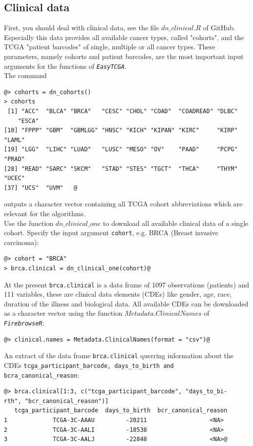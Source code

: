 \documentclass{TechReport}
\begin{document}
\subsection{Clinical data}
First, you should deal with clinical data, see the file $dn\_clinical.R$ of GitHub.
Especially this data provides all available cancer types, called "cohorts", 
and the TCGA  "patient barcodes"  of single, multiple or all cancer types. These
parameters, namely cohorts and patient barcodes, are the most
important input arguments for the functions of \texttt{\em EasyTCGA}. \\
The command
\begin{lstlisting}[style=base]
@> cohorts = dn_cohorts()
> cohorts
 [1] "ACC"  "BLCA" "BRCA"   "CESC" "CHOL" "COAD"  "COADREAD" "DLBC"  
    "ESCA"    
[10] "FPPP" "GBM"  "GBMLGG" "HNSC" "KICH" "KIPAN" "KIRC"     "KIRP"  "LAML"    
[19] "LGG"  "LIHC" "LUAD"   "LUSC" "MESO" "OV"    "PAAD"     "PCPG"  "PRAD"    
[28] "READ" "SARC" "SKCM"   "STAD" "STES" "TGCT"  "THCA"     "THYM"  "UCEC"    
[37] "UCS"  "UVM"   @
\end{lstlisting}
outputs a character vector containing all TCGA cohort abbreviations which are
relevant for the algorithms.\\
Use the function $dn\_clinical\_one$ to download all available clinical data of a
single cohort. Specify the input argument {\tt cohort}, e.g. BRCA 
(Breast invasive carcinoma):  
\begin{lstlisting}[style=base]
@> cohort = "BRCA"
> brca.clinical = dn_clinical_one(cohort)@
\end{lstlisting}
At the present {\tt brca.clinical} is a data frame of 1097 observations (patients)
and 111 variables, these are clinical data elements (CDEs) like 
gender, age, race, duration of the illness and biological data. All available CDEs
can be downloaded as a character vector using the 
function $Metadata.ClinicalNames$ of \texttt{\em FirebrowseR}:
\begin{lstlisting}[style=base]
@> clinical.names = Metadata.ClinicalNames(format = "csv")@
\end{lstlisting}
An extract of the data frame {\tt brca.clinical} querring information about the CDEs
{\tt tcga\_participant\_barcode, days\_to\_birth and bcra\_canonical\_reason}:
\begin{lstlisting}[style=base]
@> brca.clinical[1:3, c("tcga_participant_barcode", "days_to_bi-
rth", "bcr_canonical_reason")]
   tcga_participant_barcode  days_to_birth  bcr_canonical_reason
1             TCGA-3C-AAAU         -20211                  <NA>
2             TCGA-3C-AALI         -18538                  <NA>
3             TCGA-3C-AALJ         -22848                  <NA>@
\end{lstlisting}
\end{document}
